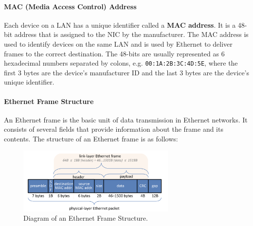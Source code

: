 \documentclass[openany,12pt]{book}
\begin{document}
\paragraph{MAC (Media Access Control) Address} Each device on a LAN has a unique identifier called a \textbf{MAC address}. It is a 48-bit address that is assigned to the NIC by the manufacturer. The MAC address is used to identify devices on the same LAN and is used by Ethernet to deliver frames to the correct destination. The 48-bits are usually represented as 6 hexadecimal numbers separated by colons, e.g. \texttt{00:1A:2B:3C:4D:5E}, where the first 3 bytes are the device's manufacturer ID and the last 3 bytes are the device's unique identifier.




\paragraph{Ethernet Frame Structure} An Ethernet frame is the basic unit of data transmission in Ethernet networks. It consists of several fields that provide information about the frame and its contents. The structure of an Ethernet frame is as follows:

\begin{figure}[H]
\centering
\includegraphics[width=0.7\textwidth]{EthernetFrame.png}
\caption{Diagram of an Ethernet Frame Structure.}
\end{figure}
\end{document}

